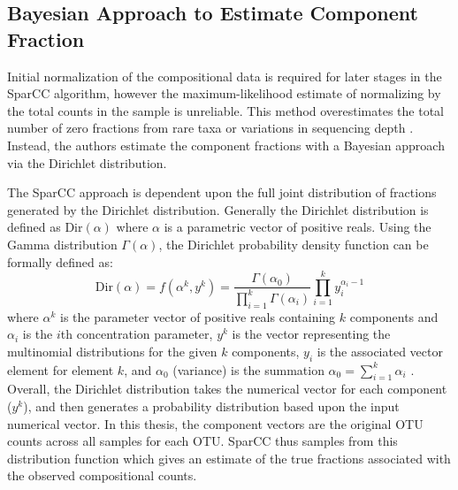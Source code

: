 \subsection{Bayesian Approach to Estimate Component Fraction}\label{theory-bayes}
Initial normalization of the compositional data is required for later stages in the \acrshort{SparCC} algorithm, however the maximum-likelihood estimate of normalizing by the total counts in the sample is unreliable. This method overestimates the total number of zero fractions from rare taxa or variations in sequencing depth \citep{Agresti2005,Friedman2012}. Instead, the authors estimate the component fractions with a Bayesian approach via the Dirichlet distribution.

The \acrshort{SparCC} approach is dependent upon the full joint distribution of fractions generated by the Dirichlet distribution. Generally the Dirichlet distribution is defined as $\text{Dir}\left(\alpha\right)$ where $\alpha$ is a parametric vector of positive reals. Using the Gamma distribution $\Gamma \left(\alpha\right)$,
the Dirichlet probability density function can be formally defined as:
\begin{equation}\label{eq:-dirich}
    \text{Dir}\left( \alpha \right) = f\left(\alpha^k, y^k\right) = \frac{\Gamma \left( \alpha_0 \right)}{\prod^k_{i=1}\Gamma \left( \alpha_i \right)} \prod_{i=1}^k y_i^{\alpha_i -1}
\end{equation}
where $\alpha^k$ is the parameter vector of positive reals containing $k$ components and $\alpha_i$ is the $i$th concentration parameter, $y^k$ is the vector representing the multinomial distributions for the given $k$ components, $y_i$ is the associated vector element for element $k$, and $\alpha_0$ (variance) is the summation $\alpha_0 = \sum_{i=1}^k  \alpha_i$ \citep{Lin2016}. Overall, the Dirichlet distribution takes the numerical vector for each component ($y^k$), and then generates a probability distribution based upon the input numerical vector. In this thesis, the component vectors are the original \acrshort{OTU} counts across all samples for each \acrshort{OTU}. \acrshort{SparCC} thus samples from this distribution function which gives an estimate of the true fractions associated with the observed compositional counts.  

